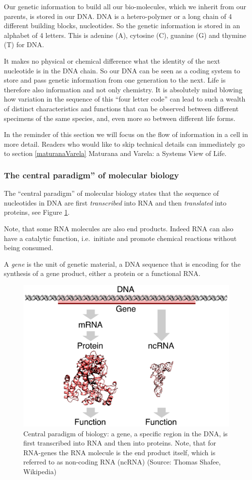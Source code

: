 \documentclass[
  11pt,
]{book}
\begin{document}
Our genetic information to build all our bio-molecules, which we inherit from our parents, is stored in our DNA. DNA is a hetero-polymer or a long chain of 4 different building blocks, nucleotides. So the genetic information is stored in an alphabet of 4 letters. This is
adenine (A), cytosine (C), guanine (G) and thymine (T) for DNA.

It makes no physical or chemical difference what the identity of the next nucleotide is in the DNA chain. So our DNA can be seen as a coding system to store and pass genetic information from one generation to the next. Life is therefore also information and not only chemistry. It is absolutely mind blowing how variation in the sequence of this ``four letter code'' can lead to such a wealth of distinct characteristics and functions that can be observed between different specimens of the same species, and, even more so between different life forms.

In the reminder of this section we will focus on the flow of information in a cell in more detail. Readers who would like to skip technical details can immediately go to section \ref{maturanaVarela} Maturana and Varela: a Systems View of Life.

\hypertarget{the-central-paradigm-of-molecular-biology}{%
\subsubsection{The central paradigm'' of molecular biology}\label{the-central-paradigm-of-molecular-biology}}

The ``central paradigm'' of molecular biology states that the sequence of nucleotides in DNA are first \emph{transcribed} into RNA and then \emph{translated} into proteins, see Figure \ref{fig:centralParadigm}.

Note, that some RNA molecules are also end products. Indeed RNA can also have a catalytic function, i.e.~initiate and promote chemical reactions without being consumed.

A \emph{gene} is the unit of genetic material, a DNA sequence that is encoding for the synthesis of a gene product, either a protein or a functional RNA.

\begin{figure}

{\centering \includegraphics[width=0.5\linewidth]{./figs/gene} 

}

\caption{Central paradigm of biology: a gene, a specific region in the DNA, is first transcribed into RNA and then into proteins. Note, that for RNA-genes the RNA molecule is the end product itself, which is referred to as non-coding RNA (ncRNA) (Source: Thomas Shafee, Wikipedia)}\label{fig:centralParadigm}
\end{figure}
\end{document}
